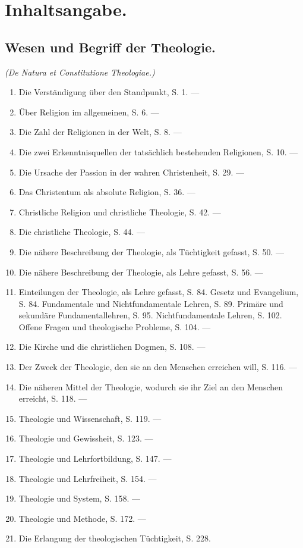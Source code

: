 \section*{Inhaltsangabe.}
\subsection*{Wesen und Begriff der Theologie.}
\textit{(De Natura et Constitutione Theologiae.)}
\begin{enumerate}
\item Die Verständigung über den Standpunkt, S. 1. —
\item Über Religion im allgemeinen, S. 6. —
\item Die Zahl der Religionen in der Welt, S. 8. —
\item Die zwei Erkenntnisquellen der tatsächlich bestehenden Religionen, S. 10. —
\item Die Ursache der Passion in der wahren Christenheit, S. 29. —
\item Das Christentum als absolute Religion, S. 36. —
\item Christliche Religion und christliche Theologie, S. 42. —
\item Die christliche Theologie, S. 44. —
\item Die nähere Beschreibung der Theologie, als Tüchtigkeit gefasst, S. 50. —
\item Die nähere Beschreibung der Theologie, als Lehre gefasst, S. 56. —
\item Einteilungen der Theologie, als Lehre gefasst, S. 84. Gesetz und Evangelium, S. 84. Fundamentale und Nichtfundamentale Lehren, S. 89. Primäre und sekundäre Fundamentallehren, S. 95. Nichtfundamentale Lehren, S. 102. Offene Fragen und theologische Probleme, S. 104. —
\item Die Kirche und die christlichen Dogmen, S. 108. —
\item Der Zweck der Theologie, den sie an den Menschen erreichen will, S. 116. —
\item Die näheren Mittel der Theologie, wodurch sie ihr Ziel an den Menschen erreicht, S. 118. —
\item Theologie und Wissenschaft, S. 119. —
\item Theologie und Gewissheit, S. 123. —
\item Theologie und Lehrfortbildung, S. 147. —
\item Theologie und Lehrfreiheit, S. 154. —
\item Theologie und System, S. 158. —
\item Theologie und Methode, S. 172. —
\item Die Erlangung der theologischen Tüchtigkeit, S. 228.
\end{enumerate}

